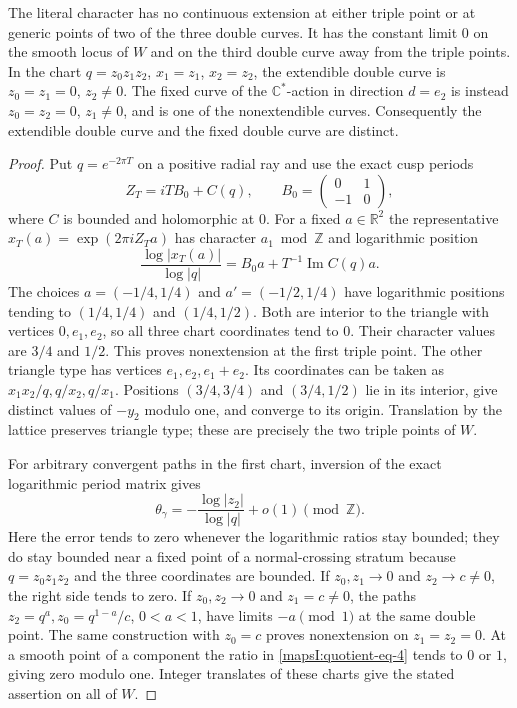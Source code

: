 \begin{proposition}\label{mapsI:src:A.1.2}
The literal character has no continuous extension at either
triple point or at generic points of two of the three double
curves.  It has the constant limit $0$ on the smooth locus of
$W$ and on the third double curve away from the triple points.
In the chart $q=z_0z_1z_2$, $x_1=z_1$, $x_2=z_2$, the extendible
double curve is $z_0=z_1=0$, $z_2\ne0$.  The fixed curve of the
$\mathbb C^*$-action in direction $d=e_2$ is instead
$z_0=z_2=0$, $z_1\ne0$, and is one of the nonextendible curves.
Consequently the extendible double curve and the fixed double curve are distinct.
\end{proposition}

\begin{proof}
Put $q=e^{-2\pi T}$ on a positive radial ray and use the exact
cusp periods
\[
 Z_T=iTB_0+C(q),\qquad
 B_0=\begin{pmatrix}0&1\\-1&0\end{pmatrix},
\]
where $C$ is bounded and holomorphic at $0$.  For a fixed
$a\in\mathbb R^2$ the representative
$x_T(a)=\exp(2\pi iZ_Ta)$ has character $a_1\bmod\mathbb Z$ and
logarithmic position
\[
 \frac{\log|x_T(a)|}{\log|q|}
 =B_0a+T^{-1}\operatorname{Im}C(q)a.
 \label{mapsI:quotient-eq-3}
\]
The choices $a=(-1/4,1/4)$ and $a'=(-1/2,1/4)$ have logarithmic
positions tending to $(1/4,1/4)$ and $(1/4,1/2)$.
Both are interior to the triangle with vertices $0,e_1,e_2$,
so all three chart coordinates tend to $0$.  Their character
values are $3/4$ and $1/2$.  This proves nonextension at the
first triple point.  The other triangle type has vertices
$e_1,e_2,e_1+e_2$.  Its coordinates can be taken as
$x_1x_2/q,q/x_2,q/x_1$.  Positions $(3/4,3/4)$ and
$(3/4,1/2)$ lie in its interior, give distinct values of $-y_2$
modulo one, and converge to its origin.  Translation by the
lattice preserves triangle type; these are precisely the two
triple points of $W$.

For arbitrary convergent paths in the first chart, inversion
of the exact logarithmic period matrix gives
\[
 \theta_\gamma=-\frac{\log|z_2|}{\log|q|}+o(1)\pmod{\mathbb Z}.
 \label{mapsI:quotient-eq-4}
\]
Here the error tends to zero whenever the logarithmic ratios
stay bounded; they do stay bounded near a fixed point of a
normal-crossing stratum because $q=z_0z_1z_2$ and the three
coordinates are bounded.  If $z_0,z_1\to0$ and $z_2\to c\ne0$,
the right side tends to zero.  If $z_0,z_2\to0$ and $z_1=c\ne0$,
the paths $z_2=q^a,z_0=q^{1-a}/c$, $0<a<1$, have limits
$-a\pmod1$ at the same double point.  The same construction
with $z_0=c$ proves nonextension on $z_1=z_2=0$.
At a smooth point of a component the ratio in \eqref{mapsI:quotient-eq-4} tends
to $0$ or $1$, giving zero modulo one.  Integer translates
of these charts give the stated assertion on all of $W$.


\end{proof}
